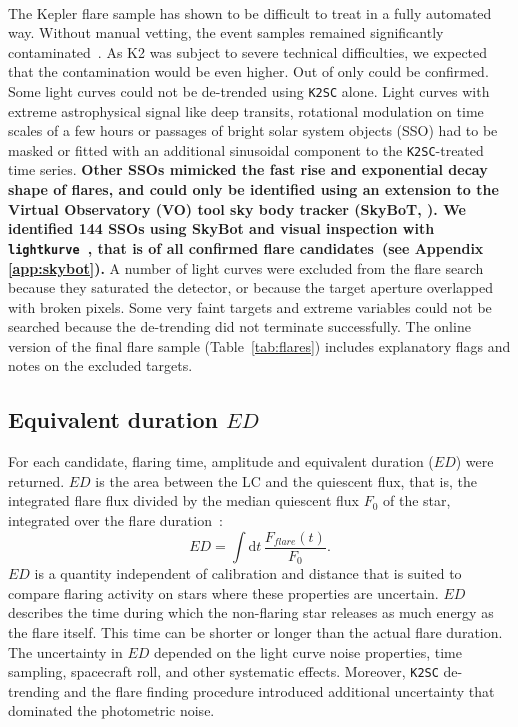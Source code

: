 \documentclass{aa}
\begin{document}
\\
The Kepler flare sample has shown to be difficult to treat in a fully automated way. Without manual vetting, the event samples remained significantly contaminated~\citep{yang2019}. As K2 was subject to severe technical difficulties, we expected that the contamination would be even higher. Out of only could be confirmed. Some light curves could not be de-trended using \texttt{K2SC} alone. Light curves with extreme astrophysical signal like deep transits, rotational modulation on time scales of a few hours or passages of bright solar system objects (SSO) had to be masked or fitted with an additional sinusoidal component to the \texttt{K2SC}-treated time series. \textbf{Other SSOs mimicked the fast rise and exponential decay shape of flares, and could only be identified using an extension to the Virtual Observatory (VO) tool sky body tracker (SkyBoT, \citealt{berthier2006, berthier2016}). We identified 144 SSOs using SkyBot and visual inspection with \texttt{lightkurve}~\citep{lightkurve2018}, that is of all confirmed flare candidates~(see Appendix \ref{app:skybot}).} A number of light curves were excluded from the flare search because they saturated the detector, or because the target aperture overlapped with broken pixels. Some very faint targets and extreme variables could not be searched because the de-trending did not terminate successfully. The online version of the final flare sample (Table~\ref{tab:flares}) includes explanatory flags and notes on the excluded targets. 
\subsection{Equivalent duration $ED$}
For each candidate, flaring time, amplitude and equivalent duration ($ED$) were returned.
$ED$ is the area between the LC and the quiescent flux, that is, the integrated flare flux divided by the median quiescent flux $F_0$ of the star, integrated over the flare duration~\citep{gershberg1972}:
\begin{equation}
\label{eq:ED}
ED=\displaystyle \int \mathrm dt\, \frac{F_{flare}(t)}{F_0}.
\end{equation}
$ED$ is a quantity independent of calibration and distance that is suited to compare flaring activity on stars where these properties are uncertain. $ED$ describes the time during which the non-flaring star releases as much energy as the flare itself. This time can be shorter or longer than the actual flare duration. 
The uncertainty in $ED$ depended on the light curve noise properties, time sampling, spacecraft roll, and other systematic effects. Moreover, \texttt{K2SC} de-trending and the flare finding procedure introduced additional uncertainty that dominated the photometric noise. 
\end{document}
